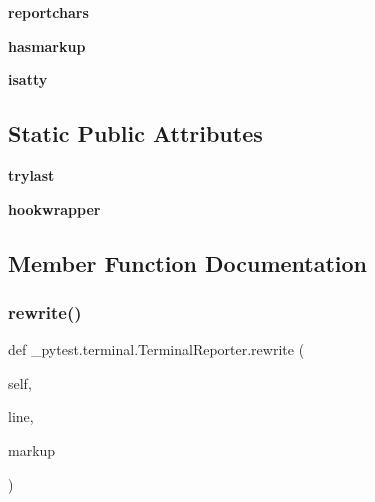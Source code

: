 \begin{DoxyCompactItemize}
\item 
\mbox{\label{class__pytest_1_1terminal_1_1_terminal_reporter_ae776c849a4371506ee832ebc9c4df9eb}} 
{\bfseries reportchars}
\item 
\mbox{\label{class__pytest_1_1terminal_1_1_terminal_reporter_ad8940742ebf0585658a140c95fa9a29a}} 
{\bfseries hasmarkup}
\item 
\mbox{\label{class__pytest_1_1terminal_1_1_terminal_reporter_af0be9aef851ac966d14a0b3d3279253d}} 
{\bfseries isatty}
\end{DoxyCompactItemize}
\subsection*{Static Public Attributes}
\begin{DoxyCompactItemize}
\item 
\mbox{\label{class__pytest_1_1terminal_1_1_terminal_reporter_a5a448012351698f9a47180c9c2b8d597}} 
{\bfseries trylast}
\item 
\mbox{\label{class__pytest_1_1terminal_1_1_terminal_reporter_a9c383ff8280989cebc9f182370a43d8d}} 
{\bfseries hookwrapper}
\end{DoxyCompactItemize}


\subsection{Member Function Documentation}
\mbox{\label{class__pytest_1_1terminal_1_1_terminal_reporter_a3121b9c308199a14803ffbf1182f2e90}} 
\subsubsection{\texorpdfstring{rewrite()}{rewrite()}}
{\footnotesize\ttfamily def \+\_\+pytest.\+terminal.\+Terminal\+Reporter.\+rewrite (\begin{DoxyParamCaption}\item[{}]{self,  }\item[{}]{line,  }\item[{}]{markup }\end{DoxyParamCaption})}

